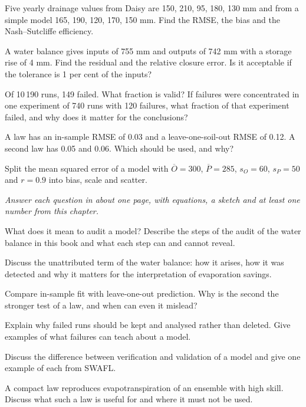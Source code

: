 \begin{exlist}
\item Five yearly drainage values from Daisy are 150, 210, 95, 180, 130 mm and from a simple model 165, 190, 120, 170, 150 mm. Find the RMSE, the bias and the Nash--Sutcliffe efficiency.
\item A water balance gives inputs of 755 mm and outputs of 742 mm with a storage rise of 4 mm. Find the residual and the relative closure error. Is it acceptable if the tolerance is 1 per cent of the inputs?
\item Of 10\,190 runs, 149 failed. What fraction is valid? If failures were concentrated in one experiment of 740 runs with 120 failures, what fraction of that experiment failed, and why does it matter for the conclusions?
\item A law has an in-sample RMSE of 0.03 and a leave-one-soil-out RMSE of 0.12. A second law has 0.05 and 0.06. Which should be used, and why?
\item Split the mean squared error of a model with $\overline O=300$, $\overline P=285$, $s_O=60$, $s_P=50$ and $r=0.9$ into bias, scale and scatter.
\end{exlist}
{\small\itshape Answer each question in about one page, with equations, a sketch and at least one number from this chapter.}\par\vspace{3pt}
\begin{exlist}
\item What does it mean to audit a model? Describe the steps of the audit of the water balance in this book and what each step can and cannot reveal.
\item Discuss the unattributed term of the water balance: how it arises, how it was detected and why it matters for the interpretation of evaporation savings.
\item Compare in-sample fit with leave-one-out prediction. Why is the second the stronger test of a law, and when can even it mislead?
\item Explain why failed runs should be kept and analysed rather than deleted. Give examples of what failures can teach about a model.
\item Discuss the difference between verification and validation of a model and give one example of each from SWAFL.
\item A compact law reproduces evapotranspiration of an ensemble with high skill. Discuss what such a law is useful for and where it must not be used.
\end{exlist}
